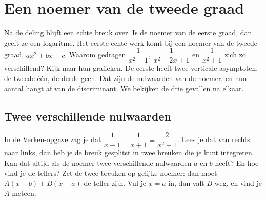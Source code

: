 \begin{oefeningen}
\end{oefeningen}

\section{Een noemer van de tweede graad}

Na de deling blijft een echte breuk over. Is de noemer van de eerste graad, dan geeft ze een logaritme. Het eerste echte werk komt bij een noemer van de tweede graad, $ax^2 + bx + c$. Waarom gedragen $\dfrac{1}{x^2 - 1}$, $\dfrac{1}{x^2 - 2x + 1}$ en $\dfrac{1}{x^2 + 1}$ zich zo verschillend? Kijk naar hun grafieken. De eerste heeft twee verticale asymptoten, de tweede één, de derde geen. Dat zijn de nulwaarden van de noemer, en hun aantal hangt af van de discriminant. We bekijken de drie gevallen na elkaar.


\subsection{Twee verschillende nulwaarden}

In de Verken-opgave zag je dat $\dfrac{1}{x - 1} - \dfrac{1}{x + 1} = \dfrac{2}{x^2 - 1}$. Lees je dat van rechts naar links, dan heb je de breuk gesplitst in twee breuken die je kunt integreren. Kan dat altijd als de noemer twee verschillende nulwaarden $a$ en $b$ heeft? En hoe vind je de tellers? Zet de twee breuken op gelijke noemer: dan moet $A(x - b) + B(x - a)$ de teller zijn. Vul je $x = a$ in, dan valt $B$ weg, en vind je $A$ meteen.

